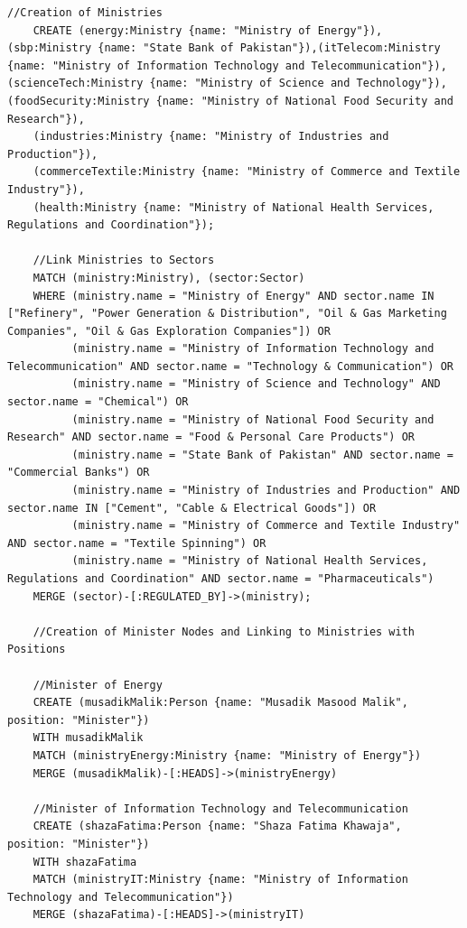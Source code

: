 \documentclass[12pt]{article}
\begin{document}
\begin{lstlisting}[frame=single]
    //Creation of Ministries
    CREATE (energy:Ministry {name: "Ministry of Energy"}),(sbp:Ministry {name: "State Bank of Pakistan"}),(itTelecom:Ministry {name: "Ministry of Information Technology and Telecommunication"}),(scienceTech:Ministry {name: "Ministry of Science and Technology"}),(foodSecurity:Ministry {name: "Ministry of National Food Security and Research"}),
    (industries:Ministry {name: "Ministry of Industries and Production"}),
    (commerceTextile:Ministry {name: "Ministry of Commerce and Textile Industry"}),
    (health:Ministry {name: "Ministry of National Health Services, Regulations and Coordination"});

    //Link Ministries to Sectors
    MATCH (ministry:Ministry), (sector:Sector)
    WHERE (ministry.name = "Ministry of Energy" AND sector.name IN ["Refinery", "Power Generation & Distribution", "Oil & Gas Marketing Companies", "Oil & Gas Exploration Companies"]) OR
          (ministry.name = "Ministry of Information Technology and Telecommunication" AND sector.name = "Technology & Communication") OR
          (ministry.name = "Ministry of Science and Technology" AND sector.name = "Chemical") OR
          (ministry.name = "Ministry of National Food Security and Research" AND sector.name = "Food & Personal Care Products") OR
          (ministry.name = "State Bank of Pakistan" AND sector.name = "Commercial Banks") OR
          (ministry.name = "Ministry of Industries and Production" AND sector.name IN ["Cement", "Cable & Electrical Goods"]) OR
          (ministry.name = "Ministry of Commerce and Textile Industry" AND sector.name = "Textile Spinning") OR
          (ministry.name = "Ministry of National Health Services, Regulations and Coordination" AND sector.name = "Pharmaceuticals")
    MERGE (sector)-[:REGULATED_BY]->(ministry);

    //Creation of Minister Nodes and Linking to Ministries with Positions

    //Minister of Energy
    CREATE (musadikMalik:Person {name: "Musadik Masood Malik", position: "Minister"})
    WITH musadikMalik
    MATCH (ministryEnergy:Ministry {name: "Ministry of Energy"})
    MERGE (musadikMalik)-[:HEADS]->(ministryEnergy)
    
    //Minister of Information Technology and Telecommunication
    CREATE (shazaFatima:Person {name: "Shaza Fatima Khawaja", position: "Minister"})
    WITH shazaFatima
    MATCH (ministryIT:Ministry {name: "Ministry of Information Technology and Telecommunication"})
    MERGE (shazaFatima)-[:HEADS]->(ministryIT)
    

\end{lstlisting}
\end{document}
